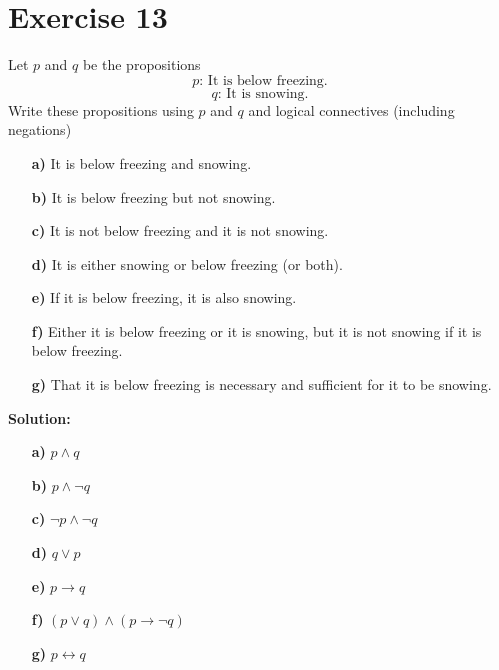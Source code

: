 \documentclass{Axon}
\begin{document}
\section*{Exercise 13}
Let \(p\) and \(q\) be the propositions
\begin{equation}
    p\text{: It is below freezing.}
\end{equation}
\begin{equation}
    q\text{: It is snowing.}
\end{equation}
Write these propositions using \(p\) and \(q\) and logical connectives (including negations)
\begin{enumerate}
    \item[\textbf{a)}] It is below freezing and snowing.
    \item[\textbf{b)}] It is below freezing but not snowing.
    \item[\textbf{c)}] It is not below freezing and it is not snowing.
    \item[\textbf{d)}] It is either snowing or below freezing (or both).
    \item[\textbf{e)}] If it is below freezing, it is also snowing.
    \item[\textbf{f)}] Either it is below freezing or it is snowing, but it is not snowing if it is below freezing.
    \item[\textbf{g)}] That it is below freezing is necessary and sufficient  for it to be snowing.
\end{enumerate}

\noindent
\textbf{Solution:}
\begin{enumerate}
    \item[\textbf{a)}] \(p \land q\)
    \item[\textbf{b)}] \(p \land \lnot q\)
    \item[\textbf{c)}] \(\lnot p \land \lnot q\)
    \item[\textbf{d)}] \(q \lor p\)
    \item[\textbf{e)}] \(p \to q\)
    \item[\textbf{f)}] \((p \lor q) \land (p \to \lnot q)\)
    \item[\textbf{g)}] \(p \leftrightarrow q\)
\end{enumerate}
\end{document}
